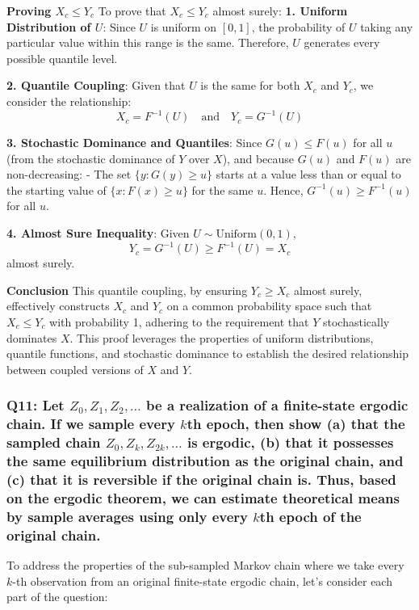 \documentclass[8pt]{article}
\begin{document}
\textbf{Proving \(X_c \leq Y_c\)}
To prove that \(X_c \leq Y_c\) almost surely:
\textbf{1. Uniform Distribution of \(U\)}: Since \(U\) is uniform on \([0, 1]\), the probability of \(U\) taking any particular value within this range is the same. Therefore, \(U\) generates every possible quantile level.

\textbf{2. Quantile Coupling}: Given that \(U\) is the same for both \(X_c\) and \(Y_c\), we consider the relationship:
   \[
   X_c = F^{-1}(U) \quad \text{and} \quad Y_c = G^{-1}(U)
   \]

\textbf{3. Stochastic Dominance and Quantiles}: Since \(G(u) \leq F(u)\) for all \(u\) (from the stochastic dominance of \(Y\) over \(X\)), and because \(G(u)\) and \(F(u)\) are non-decreasing:
   - The set \(\{ y : G(y) \geq u \}\) starts at a value less than or equal to the starting value of \(\{ x : F(x) \geq u \}\) for the same \(u\). Hence, \(G^{-1}(u) \geq F^{-1}(u)\) for all \(u\).

\textbf{4. Almost Sure Inequality}: Given \(U \sim \text{Uniform}(0, 1)\),
   \[
   Y_c = G^{-1}(U) \geq F^{-1}(U) = X_c
   \]
   almost surely.

\textbf{Conclusion}
This quantile coupling, by ensuring \(Y_c \geq X_c\) almost surely, effectively constructs \(X_c\) and \(Y_c\) on a common probability space such that \(X_c \leq Y_c\) with probability 1, adhering to the requirement that \(Y\) stochastically dominates \(X\). This proof leverages the properties of uniform distributions, quantile functions, and stochastic dominance to establish the desired relationship between coupled versions of \(X\) and \(Y\).

\subsubsection*{Q11:
Let \(Z_0, Z_1, Z_2, \ldots\) be a realization of a finite-state ergodic chain. If we sample every \(k\)th epoch, then show (a) that the sampled chain \(Z_0, Z_k, Z_{2k}, \ldots\) is ergodic, (b) that it possesses the same equilibrium distribution as the original chain, and (c) that it is reversible if the original chain is. Thus, based on the ergodic theorem, we can estimate theoretical means by sample averages using only every \(k\)th epoch of the original chain.}

To address the properties of the sub-sampled Markov chain where we take every \(k\)-th observation from an original finite-state ergodic chain, let's consider each part of the question:
\end{document}
